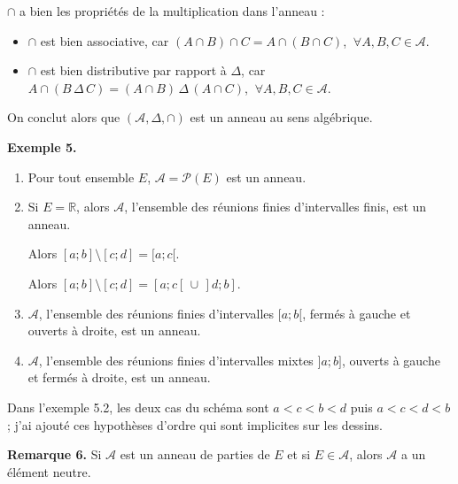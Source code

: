 \documentclass[11pt,a4paper]{article}
\newcommand{\R}{\mathbb{R}}
\newcommand{\A}{\mathscr{A}}
\newcommand{\Pp}{\mathscr{P}}
\begin{document}
$\cap$ a bien les propriétés de la multiplication dans l'anneau :
\begin{itemize}[leftmargin=1.2cm]
  \item $\cap$ est bien associative, car $(A\cap B)\cap C=A\cap(B\cap C)$, $\ \forall A,B,C\in\A$.
  \item $\cap$ est bien distributive par rapport à $\Delta$, car
        $A\cap(B\,\Delta\, C)=(A\cap B)\,\Delta\,(A\cap C)$, $\ \forall A,B,C\in\A$.
\end{itemize}
On conclut alors que $(\A,\Delta,\cap)$ est un anneau au sens algébrique.

\textbf{\color{bleu}Exemple 5.}
\begin{enumerate}[label=\textbf{\arabic*-},leftmargin=1.2cm]
  \item Pour tout ensemble $E$, $\A=\Pp(E)$ est un anneau.
  \item Si $E=\R$, alors $\A$, l'ensemble des réunions finies d'intervalles finis, est un anneau.
  \begin{center}
  \end{center}
  Alors $[a;b]\setminus[c;d]=[a;c[$.
  \begin{center}
  \end{center}
  Alors $[a;b]\setminus[c;d]=[a;c[\,\cup\,]d;b]$.
  \item $\A$, l'ensemble des réunions finies d'intervalles $[a;b[$, fermés à gauche et ouverts à droite,
        est un anneau.
  \item $\A$, l'ensemble des réunions finies d'intervalles mixtes $]a;b]$, ouverts à gauche et fermés à droite,
        est un anneau.
\end{enumerate}

\begin{note}
Dans l'exemple 5.2, les deux cas du schéma sont $a<c<b<d$ puis $a<c<d<b$ ; j'ai ajouté ces hypothèses
d'ordre qui sont implicites sur les dessins.
\end{note}

\textbf{\color{bleu}Remarque 6.}
Si $\A$ est un anneau de parties de $E$ et si $E\in\A$, alors $\A$ a un élément neutre.
\end{document}
